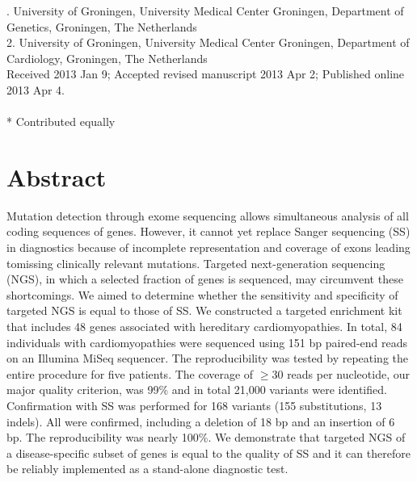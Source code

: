 . University of Groningen, University Medical Center Groningen, Department of Genetics, Groningen, The Netherlands\\
2. University of Groningen, University Medical Center Groningen, Department of Cardiology, Groningen, The Netherlands\\


\noindent
Received 2013 Jan 9; Accepted revised manuscript 2013 Apr 2; Published online 2013 Apr 4.
\\~\\
* Contributed equally

\section*{Abstract}\label{abstract}
Mutation detection through exome sequencing allows simultaneous analysis of all coding sequences of genes. 
However, it cannot yet replace Sanger sequencing (SS) in diagnostics because of incomplete representation and coverage of exons leading tomissing clinically relevant mutations. 
Targeted next-generation sequencing (NGS), in which a selected fraction of genes is sequenced, may circumvent these shortcomings. 
We aimed to determine whether the sensitivity and specificity of targeted NGS is equal to those of SS. 
We constructed a targeted enrichment kit that includes 48 genes associated with hereditary cardiomyopathies. 
In total, 84 individuals with cardiomyopathies were sequenced using 151 bp paired-end reads on an Illumina MiSeq sequencer. 
The reproducibility was tested by repeating the entire procedure for five patients. 
The coverage of $\geq$30 reads per nucleotide, our major quality criterion, was 99\% and in total {\textapprox}21,000 variants were identified. 
Confirmation with SS was performed for 168 variants (155 substitutions, 13 indels). 
All were confirmed, including a deletion of 18 bp and an insertion of 6 bp. 
The reproducibility was nearly 100\%. 
We demonstrate that targeted NGS of a disease-specific subset of genes is equal to the quality of SS and it can therefore be reliably implemented as a stand-alone diagnostic test.

